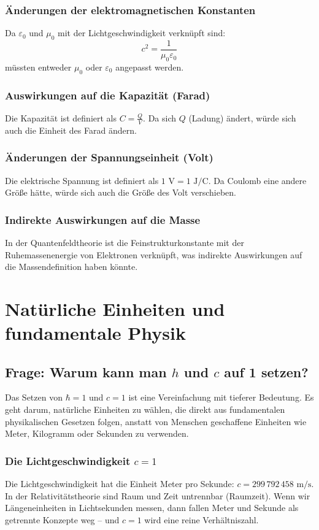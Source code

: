 \documentclass{article}
\begin{document}
	\subsubsection{Änderungen der elektromagnetischen Konstanten}
	Da $\varepsilon_0$ und $\mu_0$ mit der Lichtgeschwindigkeit verknüpft sind:
	$$c^2 = \frac{1}{\mu_0\varepsilon_0}$$
	müssten entweder $\mu_0$ oder $\varepsilon_0$ angepasst werden.
	
	\subsubsection{Auswirkungen auf die Kapazität (Farad)}
	Die Kapazität ist definiert als $C = \frac{Q}{V}$. Da sich $Q$ (Ladung) ändert, würde sich auch die Einheit des Farad ändern.
	
	\subsubsection{Änderungen der Spannungseinheit (Volt)}
	Die elektrische Spannung ist definiert als $1 \text{ V} = 1 \text{ J}/\text{C}$. Da Coulomb eine andere Größe hätte, würde sich auch die Größe des Volt verschieben.
	
	\subsubsection{Indirekte Auswirkungen auf die Masse}
	In der Quantenfeldtheorie ist die Feinstrukturkonstante mit der Ruhemassenenergie von Elektronen verknüpft, was indirekte Auswirkungen auf die Massendefinition haben könnte.
	
	\section{Natürliche Einheiten und fundamentale Physik}
	
	\subsection{Frage: Warum kann man $h$ und $c$ auf 1 setzen?}
	
	Das Setzen von $\hbar = 1$ und $c = 1$ ist eine Vereinfachung mit tieferer Bedeutung. Es geht darum, natürliche Einheiten zu wählen, die direkt aus fundamentalen physikalischen Gesetzen folgen, anstatt von Menschen geschaffene Einheiten wie Meter, Kilogramm oder Sekunden zu verwenden.
	
	\subsubsection{Die Lichtgeschwindigkeit $c = 1$}
	Die Lichtgeschwindigkeit hat die Einheit Meter pro Sekunde: $c = 299\,792\,458 \text{ m/s}$. In der Relativitätstheorie sind Raum und Zeit untrennbar (Raumzeit). Wenn wir Längeneinheiten in Lichtsekunden messen, dann fallen Meter und Sekunde als getrennte Konzepte weg – und $c = 1$ wird eine reine Verhältniszahl.
	
\end{document}
